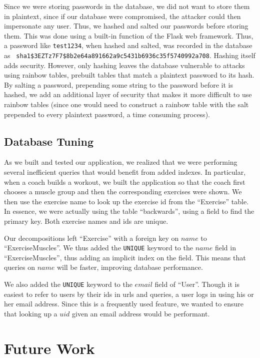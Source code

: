 \documentclass{article}
\begin{document}
Since we were storing passwords in the database, we did not want to store them
in plaintext, since if our database were compromised, the attacker could then
impersonate any user. Thus, we hashed and salted our passwords before storing them.
This was done using a built-in function of the Flask web framework. Thus,
a password like {\tt test1234}, when hashed and salted, was recorded in the
database as \verb, sha1$3EZTz7F7$8b2e64a891662a9c5431b6936c35f5740992a708,. 
Hashing itself adds security. However, only hashing leaves the database vulnerable
to attacks using rainbow tables, prebuilt tables that match a plaintext password
to its hash. By salting a password, prepending some string to the password before
it is hashed, we add an additional layer of security that makes it more difficult
to use rainbow tables (since one would need to construct a rainbow table with the salt
prepended to every plaintext password, a time consuming process).

\subsection*{Database Tuning}

As we built and tested our application, we realized that we were performing several
inefficient queries that would benefit from added indexes. In particular, when 
a coach builds a workout, we built the application so that the coach first chooses
a muscle group and then the corresponding exercises were shown. We then use
the exercise name to look up the exercise id from the ``Exercise'' table. 
In essence, we were actually using the table ``backwards'', using a field
to find the primary key. Both exercise names and ids are unique.

Our decompositions left ``Exercise'' with a foreign key on $name$ 
to ``ExerciseMuscles''. We thus added the {\tt UNIQUE} keyword to the $name$
field in ``ExerciseMuscles'', thus adding an implicit index on the field. This
means that queries on $name$ will be faster, improving database performance.

We also added the {\tt UNIQUE} keyword to the $email$ field of ``User''. 
Though it is easiest to refer to users by their ids in urls and queries, a 
user logs in using his or her email address. Since this is a frequently used
feature, we wanted to ensure that looking up a $uid$ given an email address
would be performant. 

\section*{Future Work}
\end{document}
